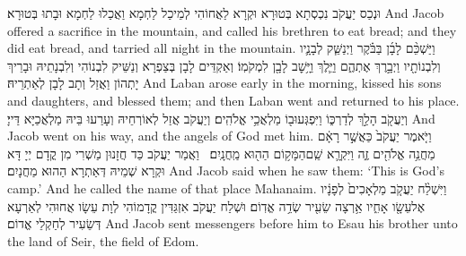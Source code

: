 {וּנְכַס יַעֲקֹב נִכְסְתָא בְּטוּרָא וּקְרָא לַאֲחוֹהִי לְמֵיכַל לַחְמָא וַאֲכַלוּ לַחְמָא וּבָתוּ בְּטוּרָא׃}
{And Jacob offered a sacrifice in the mountain, and called his brethren to eat bread; and they did eat bread, and tarried all night in the mountain.}{}
\newperek
{}%
{וַיַּשְׁכֵּ֨ם לָבָ֜ן בַּבֹּ֗קֶר וַיְנַשֵּׁ֧ק לְבָנָ֛יו וְלִבְנוֹתָ֖יו וַיְבָ֣רֶךְ אֶתְהֶ֑ם וַיֵּ֛לֶךְ וַיָּ֥שׇׁב לָבָ֖ן לִמְקֹמֽוֹ׃}
{וְאַקְדֵּים לָבָן בְּצַפְרָא וְנַשֵּׁיק לִבְנוֹהִי וְלִבְנָתֵיהּ וּבָרֵיךְ יָתְהוֹן וַאֲזַל וְתָב לָבָן לְאַתְרֵיהּ׃}
{And Laban arose early in the morning, kissed his sons and daughters, and blessed them; and then Laban went and returned to his place.}{}
{וְיַעֲקֹ֖ב הָלַ֣ךְ לְדַרְכּ֑וֹ וַיִּפְגְּעוּ\maqqaf ב֖וֹ מַלְאֲכֵ֥י אֱלֹהִֽים׃}
{וְיַעֲקֹב אֲזַל לְאוֹרְחֵיהּ וְעָרַעוּ בֵּיהּ מַלְאֲכַיָּא דַּייָ׃}
{And Jacob went on his way, and the angels of God met him.}{}
{וַיֹּ֤אמֶר יַעֲקֹב֙ כַּאֲשֶׁ֣ר רָאָ֔ם מַחֲנֵ֥ה אֱלֹהִ֖ים זֶ֑ה וַיִּקְרָ֛א שֵֽׁם\maqqaf הַמָּק֥וֹם הַה֖וּא מַֽחֲנָֽיִם׃ \petucha }
{וַאֲמַר יַעֲקֹב כַּד חֲזָנוּן מַשְׁרִי מִן קֳדָם יְיָ דָּא וּקְרָא שְׁמֵיהּ דְּאַתְרָא הַהוּא מַחֲנָיִם׃}
{And Jacob said when he saw them: ‘This is God’s camp.’ And he called the name of that place Mahanaim.}{}
{וַיִּשְׁלַ֨ח יַעֲקֹ֤ב מַלְאָכִים֙ לְפָנָ֔יו אֶל\maqqaf עֵשָׂ֖ו אָחִ֑יו אַ֥רְצָה שֵׂעִ֖יר שְׂדֵ֥ה אֱדֽוֹם׃}
{וּשְׁלַח יַעֲקֹב אִזְגַּדִּין קֳדָמוֹהִי לְוָת עֵשָׂו אֲחוּהִי לְאַרְעָא דְּשֵׂעִיר לְחַקְלֵי אֱדוֹם׃}
{And Jacob sent messengers before him to Esau his brother unto the land of Seir, the field of Edom.}{}
